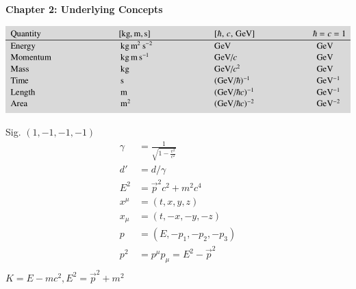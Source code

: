 \textbf{Chapter 2: Underlying Concepts}

\begin{center}
    \includegraphics[width=\linewidth]{images/natural_units.png}
\end{center}


\begin{multicols}{2}
    Sig. $(1, -1, -1, -1)$
    \begin{align*}
        \gamma &= \frac{1}{\sqrt{1 - \frac{v^2}{c^2}}}\\
        d' &= d/\gamma\\
        E^2 &= \vec{p}^2c^2 + m^2c^4 \\
        x^\mu &= (t, x, y, z) \\
        x_\mu &= (t, -x, -y, -z) \\
        p &= (E, -p_1, -p_2, -p_3) \\
        p^2 &= p^\mu p_\mu = E^2 - \vec{p}^2 \\
    \end{align*}
    $K = E - mc^2, E^2 = \vec{p}^2 + m^2$


\end{multicols}
